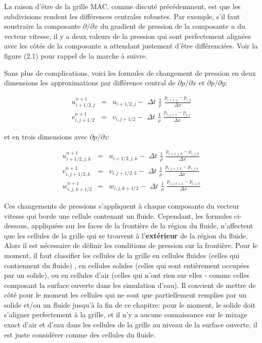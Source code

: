 \documentclass[11pt]{report}
\begin{document}
La raison d'être de la grille MAC, comme discuté précédemment, est que les subdivisions rendent les différences centrales robustes. Par exemple, s'il faut soustraire la composante $\partial/\partial x$ du gradient de pression de la composante $u$ du vecteur vitesse, il y a deux valeurs de la pression qui sont perfectement alignées avec les côtés de la composante $u$ attendant justement d'être différenciées. Voir la figure (2.1) pour rappel de la marche à suivre. \newline

Sans plus de complications, voici les formules de changement de pression en deux dimensions les approximations par différence central de $\partial p/\partial x$ et $\partial p/\partial y$:

\begin{eqnarray}
u_{i+1/2,j}^{n+1} & = & u_{i+1/2,j} - \,\, \Delta t \,\, \frac{1}{\rho} \,\,\frac{p_{i+1,j} - p_{i,j}}{\Delta x} \\
v_{i,j+1/2}^{n+1} & = & v_{i,j+1/2} -\,\, \Delta t \,\, \frac{1}{\rho} \,\, \frac{p_{i,j+1} - p_{i,j}}{\Delta x}
\end{eqnarray}

et en trois dimensions avec $\partial p/\partial z$:

\begin{eqnarray}
u_{i+1/2,j,k}^{n+1} & = & u_{i+1/2,j,k} - \,\, \Delta t \,\, \frac{1}{\rho} \,\,\frac{p_{i+1,j,k} - p_{i,j,k}}{\Delta x} \\
v_{i,j+1/2,k}^{n+1} & = & v_{i,j+1/2,k} -\,\, \Delta t \,\, \frac{1}{\rho} \,\, \frac{p_{i,j+1,k} - p_{i,j,k}}{\Delta x} \\
w_{i,j,k+1/2}^{n+1} & = & w_{i,j,k+1/2} -\,\, \Delta t \,\, \frac{1}{\rho} \,\,\frac{p_{i,j,k+1} - p_{i,j,k}}{\Delta x} 
\end{eqnarray}

Ces changements de pressions s'appliquent à chaque composante du vecteur vitesse qui borde une cellule contenant un fluide.	Cependant, les formules ci-dessous, appliquées sur les faces de la frontière de la région du fluide, n'affectent que les cellules de la grille qui se trouvent à l'\textbf{extérieur} de la région du fluide. Alors il est nécessaire de définir les conditions de pression sur la frontière. Pour le moment, il faut classifier les cellules de la grille en cellules fluides (celles qui contiennent du fluide) , en cellules solides (celles qui sont entièrement occupées par un solide), ou en cellules d'air (celles qui n'ont rien sur elles - comme celles composant la surface ouverte dans les simulation d'eau). Il convient de mettre de côté pour le moment les cellules qui ne sont que partiellement remplies par un solide et/ou un fluide jusqu'à la fin de ce chapitre: pour le moment, le solide doit s'aligner perfectement à la grille, et il n'y a aucune connaissance sur le mixage exact d'air et d'eau dans les cellules de la grille au niveau de la surface ouverte, il est juste considérer comme des cellules du fluide. \newline
\end{document}

